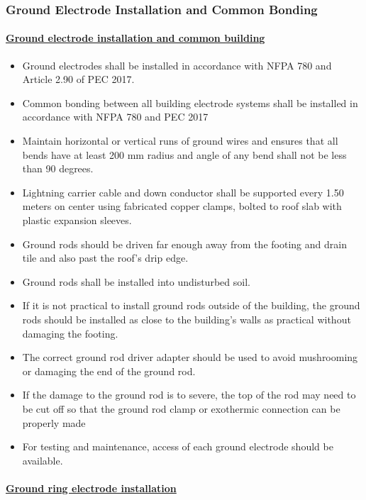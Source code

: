 \subsubsection{Ground Electrode Installation and Common Bonding }

\paragraph{\underline{Ground electrode installation and common building}}
\begin{itemize}
\item Ground electrodes shall be installed in accordance with NFPA 780 and Article 2.90 of PEC 2017.
\item 	Common bonding between all building electrode systems shall be installed in accordance with NFPA 780 and PEC 2017
\item 	Maintain horizontal or vertical runs of ground wires and ensures that all bends have at least 200 mm radius and angle of any bend shall not be less than 90 degrees.

\item  	Lightning carrier cable and down conductor shall be supported every 1.50 meters on center using fabricated copper clamps, bolted to roof slab with plastic expansion sleeves.

\item  	Ground rods should be driven far enough away from the footing and drain tile and also past the roof’s drip edge.
\item 	Ground rods shall be installed into undisturbed soil.
\item  	If it is not practical to install ground rods outside of the building, the ground rods should be installed as close to the building’s walls as practical without damaging the footing.
\item 	The correct ground rod driver adapter should be used to avoid mushrooming or damaging the end of the ground rod.
\item  	If the damage to the ground rod is to severe, the top of the rod may need to be cut off so that the ground rod clamp or exothermic connection can be properly made
\item 	For testing and maintenance, access of each ground electrode should be available.

\end{itemize}

\paragraph{\underline{Ground ring electrode installation}}

